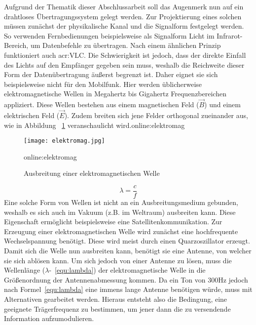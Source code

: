Aufgrund der Thematik dieser Abschlussarbeit soll das Augenmerk nun auf ein drahtloses Übertragungssystem gelegt werden. Zur Projektierung eines solchen müssen zunächst der physikalische Kanal und die Signalform festgelegt werden.
So verwenden Fernbedienungen beispielsweise als Signalform Licht im Infrarot-Bereich, um Datenbefehle zu übertragen. Nach einem ähnlichen Prinzip funktioniert auch \gls{acr:VLC}. Die Schwierigkeit ist jedoch, dass der direkte Einfall des Lichts auf den Empfänger gegeben sein muss, weshalb die Reichweite dieser Form der Datenübertragung äußerst begrenzt ist. Daher eignet sie sich beispielsweise nicht für den Mobilfunk. Hier werden üblicherweise elektromagnetische Wellen in Megahertz bis Gigahertz Frequenzbereichen appliziert. Diese Wellen bestehen aus einem magnetischen Feld ($\vec{B}$) und einem elektrischen Feld ($\vec{E}$). Zudem breiten sich jene Felder orthogonal zueinander aus, wie in Abbildung ~\ref{fig:elektromag} veranschaulicht wird.\gls{online:elektromag} 

\begin{figure}[H]
	\centering
	\texttt{[image: elektromag.jpg]}
	\caption[Ausbreitung einer elektromagnetischen Welle]{Ausbreitung einer elektromagnetischen Welle} 
	\gls{online:elektromag}
	\label{fig:elektromag}
\end{figure}
\begin{equation}
	\label{equ:lambda}
	\lambda = \frac{c}{f} 
\end{equation}
Eine solche Form von Wellen ist nicht an ein Ausbreitungsmedium gebunden, weshalb es sich auch im Vakuum (z.B. im Weltraum) ausbreiten kann. Diese Eigenschaft ermöglicht beispielsweise eine Satellitenkommunikation. Zur Erzeugung einer elektromagnetischen Welle wird zunächst eine hochfrequente Wechselspannung benötigt. Diese wird meist durch einen Quarzoszillator erzeugt. Damit sich die Welle nun ausbreiten kann, benötigt sie eine Antenne, von welcher sie sich ablösen kann.\cite{howwireless}\cite{wernerNachrichtentechnikEinfuehrungFuer2010} Um sich jedoch von einer Antenne zu lösen, muss die Wellenlänge ($\lambda$-~\ref{equ:lambda}) der elektromagnetische Welle in die Größenordnung der Antennenabmessung kommen. Da ein Ton von 300Hz jedoch nach Formel~\ref{equ:lambda} eine immens lange Antenne benötigen würde, muss mit Alternativen gearbeitet werden. Hieraus entsteht also die Bedingung, eine geeignete Trägerfrequenz zu bestimmen, um jener dann die zu versendende Information aufzumodulieren.\cite{heuermannHochfrequenztechnikKomponentenFuer2018}\cite{hoeher}
